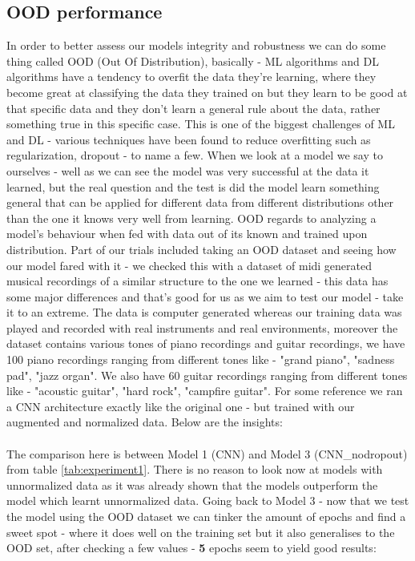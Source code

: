 \documentclass[a4paper]{article}
\begin{document}
\subsection{OOD performance}
In order to better assess our models integrity and robustness we can do some thing called OOD (Out Of Distribution), basically - ML algorithms and DL algorithms have a tendency to overfit the data they're learning, where they become great at classifying the data they trained on but they learn to be good at that specific data and they don't learn a general rule about the data, rather something true in this specific case. This is one of the biggest challenges of ML and DL - various techniques have been found to reduce overfitting such as regularization, dropout - to name a few. When we look at a model we say to ourselves - well as we can see the model was very successful at the data it learned, but the real question and the test is did the model learn something general that can be applied for different data from different distributions other than the one it knows very well from learning. OOD regards to analyzing a model's behaviour when fed with data out of its known and trained upon distribution. Part of our trials included taking an OOD dataset and seeing how our model fared with it - we checked this with a dataset of midi generated musical recordings of a similar structure to the one we learned \cite{dataset_ood} - this data has some major differences and that's good for us as we aim to test our model - take it to an extreme. The data is computer generated whereas our training data was played and recorded with real instruments and real environments, moreover the dataset contains various tones of piano recordings and guitar recordings, we have 100 piano recordings ranging from different tones like - "grand piano", "sadness pad", "jazz organ". We also have 60 guitar recordings ranging from different tones like - "acoustic guitar", "hard rock", "campfire guitar". For some reference we ran a CNN architecture exactly like the original one - but trained with our augmented and normalized data. Below are the insights:
\\\\
\noindent The comparison here is between Model 1 (CNN) and Model 3 (CNN\_nodropout) from table \ref{tab:experiment1}. There is no reason to look now at models with unnormalized data as it was already shown that the models outperform the model which learnt unnormalized data.
Going back to Model 3 - now that we test the model using the OOD dataset we can tinker the amount of epochs and find a sweet spot - where it does well on the training set but it also generalises to the OOD set, after checking a few values - \textbf{5} epochs seem to yield good results:
\end{document}
